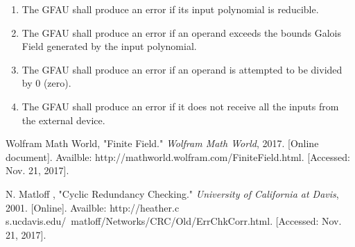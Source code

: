 \documentclass[12pt]{extarticle}
\begin{document}
            \begin{enumerate}

                \item The GFAU shall produce an error if its input polynomial
                is reducible.
                
                \item The GFAU shall produce an error if an operand exceeds the
                bounds Galois Field generated by the input polynomial.
                
                \item The GFAU shall produce an error if an operand is
                attempted to be divided by 0 (zero).
                
                \item The GFAU shall produce an error if it does not receive
                all the inputs from the external device.

            \end{enumerate}

        \begin{thebibliography}{2}
            Wolfram Math World, "Finite Field." \textit{Wolfram Math World},
            2017. [Online document]. Availble:
                  http://mathworld.wolfram.com/FiniteField.html. [Accessed:
                  Nov. 21, 2017].

            N. Matloff , "Cyclic Redundancy Checking." \textit{University of
               California at Davis}, 2001. [Online]. Availble: http://heather.c
               s.ucdavis.edu/~matloff/Networks/CRC/Old/ErrChkCorr.html.
               [Accessed: Nov. 21, 2017].
        \end{thebibliography}
\end{document}

